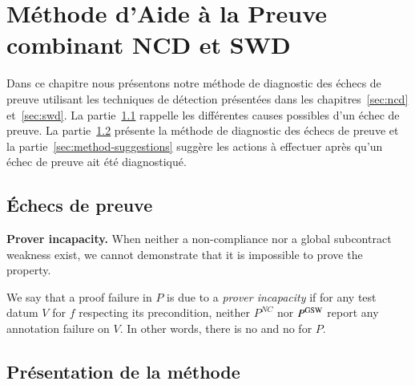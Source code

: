 
\chapter{Méthode d'Aide à la Preuve combinant NCD et SWD}
\label{sec:method}

\chapterintro


Dans ce chapitre nous présentons notre méthode de diagnostic des échecs de
preuve utilisant les techniques de détection présentées dans les
chapitres~\ref{sec:ncd} et~\ref{sec:swd}.
La partie~\ref{sec:method-proof-failures} rappelle les différentes causes
possibles d'un échec de preuve.
La partie~\ref{sec:method-presentation} présente la méthode de diagnostic des
échecs de preuve et la partie~\ref{sec:method-suggestions} suggère les actions
à effectuer après qu'un échec de preuve ait été diagnostiqué.


\section{Échecs de preuve}
\label{sec:method-proof-failures}




\textbf{Prover incapacity.}
When neither a non-compliance nor a global subcontract weakness
exist, we cannot demonstrate that it is impossible to prove the property.

\begin{definition} 
\label{def:prov-incap}
We say that a proof failure in $P$ is due to a \emph{prover incapacity} 
if for any test datum $V$ for $f$ respecting its precondition,
neither $P^{NC}$ nor $P^{\mathrm{GSW}}$ report any annotation failure on $V$.
In other words, there is no \NCCE and no \GSWCE for $P$.
\end{definition}


\section{Présentation de la méthode}
\label{sec:method-presentation}


